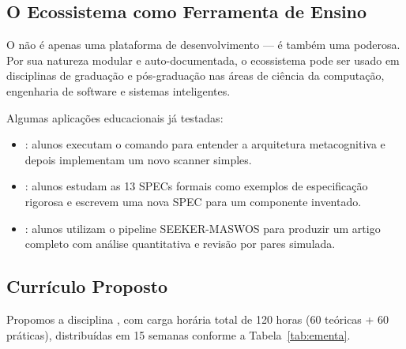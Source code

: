 \subsection{O Ecossistema como Ferramenta de Ensino}

O \opencodeeco{} não é apenas uma plataforma de desenvolvimento ---
é também uma  poderosa. Por sua
natureza modular e auto-documentada, o ecossistema pode ser usado
em disciplinas de graduação e pós-graduação nas áreas de ciência da
computação, engenharia de software e sistemas inteligentes.

Algumas aplicações educacionais já testadas:

\begin{itemize}
    \item {}: alunos executam o comando
     para entender a arquitetura
    metacognitiva e depois implementam um novo scanner simples.
    \item {}: alunos estudam as 13
    SPECs formais como exemplos de especificação rigorosa e
    escrevem uma nova SPEC para um componente inventado.
    \item {}: alunos utilizam o
    pipeline SEEKER-MASWOS para produzir um artigo completo com
    análise quantitativa e revisão por pares simulada.
\end{itemize}

\subsection{Currículo Proposto}

Propomos a disciplina ,
com carga horária total de 120 horas (60 teóricas + 60 práticas),
distribuídas em 15 semanas conforme a Tabela~\ref{tab:ementa}.

